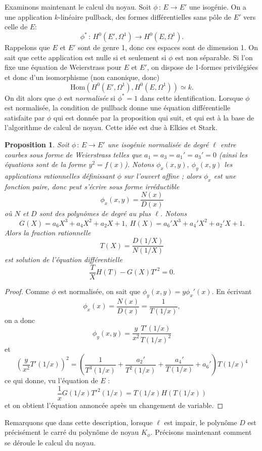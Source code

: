 \documentclass[11pt,a4paper]{article}
\newcommand{\vers}{\longrightarrow}
\newcommand{\Hom}{\mathrm{Hom}}
\newcommand{\de}{\,:\,}
\renewcommand{\v}{\vspace{5mm}}
\newtheorem*{prop}{Proposition}
\theoremstyle{definition}
\begin{document}
\v
Examinons maintenant le calcul du noyau. Soit $\phi\de E\vers E'$ une isogénie. On a une application $k$-linéaire \og pullback\fg, des formes différentielles sans pôle de $E'$ vers celle de $E$:
$$\phi^*\de H^0(E', \Omega^1)\vers H^0(E, \Omega^1).$$
Rappelons que $E$ et $E'$ sont de genre 1, donc ces espaces sont de dimension 1. On sait que cette application est nulle si et seulement si $\phi$ est non séparable. Si l'on fixe une équation de Weierstrass pour $E$ et $E'$, on dispose de 1-formes privilégiées et donc d'un isomorphisme (non canonique, donc)
$$\Hom(H^0(E', \Omega^1), H^0(E, \Omega^1))\simeq k.$$
On dit alors que $\phi$ est \emph{normalisée} si $\phi^* = 1$ dans cette identification. Lorsque $\phi$ est normalisée, la condition de pullback donne une équation différentielle satisfaite par $\phi$ qui est donnée par la proposition qui suit, et qui est à la base de l'algorithme de calcul de noyau. Cette idée est due à Elkies et Stark.

\begin{prop}
Soit $\phi\de E\vers E'$ une isogénie normalisée de degré $\ell$ entre courbes sous forme de Weierstrass telles que $a_1 = a_3 = a_1' = a_3' = 0$ (ainsi les équations sont de la forme $y^2 = f(x)$). Notons $\phi_x(x,y),\ \phi_y(x,y)$ les applications rationnelles définissant $\phi$ sur l'ouvert affine ; alors $\phi_x$ est une fonction paire, donc peut s'écrire sous forme irréductible
$$\phi_x(x, y) = \frac{N(x)}{D(x)}$$
où $N$ et $D$ sont des polynômes de degré au plus $\ell$. Notons
$$G(X) = a_6 X^3 + a_4 X^2 + a_2 X + 1,\ H(X) =a_6' X^3 + a_4' X^2 + a_2' X + 1.$$
Alors la fraction rationnelle 
$$T(X) = \frac{D(1/X)}{N(1/X)}$$
est solution de l'équation différentielle
$$\frac{T}{X} H(T) - G(X) T'^2 = 0.$$
\end{prop}

\begin{proof}
Comme $\phi$ est normalisée, on sait que $\phi_y (x, y) = y \phi_x'(x).$ En écrivant 
$$\phi_x(x) = \frac{N(x)}{D(x)} = \frac{1}{T(1/x)},$$
on a donc
$$\phi_y(x, y) = \frac{y}{x^2} \frac{T'(1/x)}{T(1/x)^2}$$
et
$$ \left(\frac{y}{x^2} T'(1/x)\right)^2 = \left(\frac{1}{T^3(1/x)} + \frac{a_2'}{T^2(1/x)} + \frac{a_4'}{T(1/x)} + a_6'\right)T(1/x)^4$$
ce qui donne, vu l'équation de $E$ :
$$ \frac{1}{x} G(1/x) T'^2(1/x) =T(1/x) H(T(1/x))$$
et on obtient l'équation annoncée après un changement de variable.
\end{proof}
\v

Remarquons que dans cette description, lorsque $\ell$ est impair, le polynôme $D$ est précisément le carré du polynôme de noyau $K_\phi$. Précisons maintenant comment se déroule le calcul du noyau.
\end{document}
